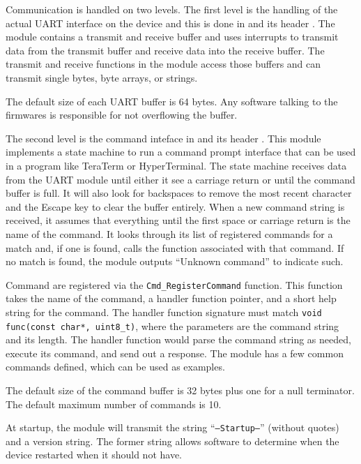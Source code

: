 \documentclass{article}
\begin{document}
Communication is handled on two levels.  The first level is the handling of the actual UART
interface on the device and this is done in  and its header
.  The module contains a transmit and receive buffer and uses interrupts to transmit
data from the transmit buffer and receive data into the receive buffer.  The transmit and receive
functions in the module access those buffers and can transmit single bytes, byte arrays, or strings.

The default size of each UART buffer is 64 bytes.  Any software talking to the firmwares is
responsible for not overflowing the buffer.

The second level is the command inteface in  and its header
. This module implements a state machine to run a command prompt interface that can be
used in a program like TeraTerm or HyperTerminal.  The state machine receives data from the UART
module until either it see a carriage return or until the command buffer is full.  It will also look
for backspaces to remove the most recent character and the Escape key to clear the buffer entirely.
When a new command string is received, it assumes that everything until the first space or carriage
return is the name of the command.  It looks through its list of registered commands for a match
and, if one is found, calls the function associated with that command.  If no match is found, the
module outputs ``Unknown command'' to indicate such.

Command are registered via the \texttt{Cmd\_RegisterCommand} function.  This function takes the name
of the command, a handler function pointer, and a short help string for the command.  The handler
function signature must match \texttt{void func(const char*, uint8\_t)}, where the parameters are the
command string and its length.  The handler function would parse the command string as needed,
execute its command, and send out a response.  The module has a few common commands defined, which
can be used as examples.

The default size of the command buffer is 32 bytes plus one for a null terminator.  The default
maximum number of commands is 10.

At startup, the module will transmit the string ``\texttt{---Startup---}'' (without quotes) and a
version string.  The former string allows software to determine when the device restarted when it
should not have.
\end{document}
